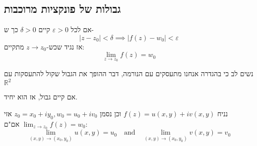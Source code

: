 \documentclass{tstextbook}
\begin{document}
\subsection{גבולות של פונקציות מרוכבות}

\begin{definition}
אם לכל \(\varepsilon>0\) קיים \(\delta>0\)  כך ש-
$$|z-z_{0}|<\delta\implies\lvert f(z)-w_{0} \rvert <\varepsilon$$
אז נגיד שכש-\(z\to z_{0}\) מתקיים:
$$\lim_{ z \to z_{0} } f(z)=w_{0}$$

\end{definition}
נשים לב כי בהגדרה אנחנו מתעסקים עם הנורמה, דבר ההופך את הגבול שקול להתעסקות עם \(\mathbb{R}^2\)

\begin{proposition}
אם קיים גבול, אז הוא יחיד.

\end{proposition}
\begin{proposition}
נניח \(f(z)=u(x,y)+i v(x,y)\) וכן נסמן \(z_{0}=x_{0}+iy_{0},w_{0}=u_{0}+iv_{0}\) אזי \(\operatorname*{lim}_{z\to z_{0}}f(z)=w_{0}\) אם"ם:
$$\operatorname*{lim}_{(x,y)\to(x_{0},y_{0})}u\left(x,y\right)=u_{0}\quad{\mathrm{and}}\quad\operatorname*{lim}_{(x,y)\to(x_{0},y_{0})}v\left(x,y\right)=v_{0}$$

\end{proposition}
\end{document}
